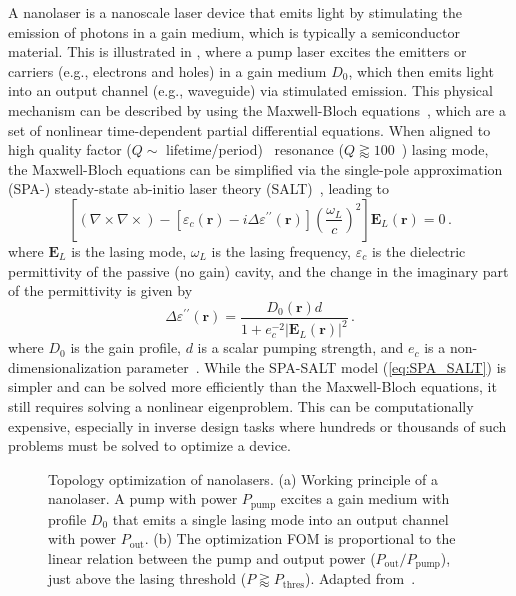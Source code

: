 A nanolaser is a nanoscale laser device that emits light by stimulating the emission of photons in a gain medium, which is typically a semiconductor material. This is illustrated
in , where a pump laser excites the emitters or carriers (e.g., electrons and holes) in a gain medium $D_0$, which then emits light into an output channel (e.g., waveguide) via
stimulated emission. This physical
mechanism can be described by using the Maxwell-Bloch equations~\cite{haken_laser_dynamics, PhysRev.134.A1429, SALT_original}, which are a set of nonlinear time-dependent 
partial differential equations. When aligned to high quality factor ($Q \sim$ lifetime/period)~\cite{phot_crys} resonance ($Q\gtrapprox 100$~\cite{cerjan_2016}) lasing
mode, the Maxwell-Bloch equations can be simplified via the single-pole approximation (SPA-) steady-state ab-initio laser theory (SALT)~\cite{Ge_2010}, leading to
\begin{equation}\label{eq:SPA_SALT}
    \left[(\nabla \times 
     \nabla \times ) -\left[\varepsilon_c(\mathbf{r})-i \Delta \varepsilon^{\prime \prime} (\mathbf{r})\right] \left(\frac{\omega_L}{c}\right)^2\right] \mathbf{E}_L(\mathbf{r})=0\,.
\end{equation}
where $\mathbf{E}_L$ is the lasing mode, $\omega_L$ is the lasing frequency, $\varepsilon_c$ is the dielectric permittivity of the passive (no gain) cavity, and the change in the 
imaginary part of the permittivity is given by
\begin{equation}\label{eq:gain_SALT}
        \Delta \varepsilon^{\prime \prime} (\mathbf{r}) =  \frac{D_0(\mathbf{r}) d}{1+ e_c^{-2}\left|\mathbf{E}_L(\mathbf{r})\right|^2}\,.
\end{equation}
where $D_0$ is the gain profile, $d$ is a scalar pumping strength, and $e_c$ is a non-dimensionalization parameter~\cite{Ge_2010}. While the SPA-SALT model (\eqref{eq:SPA_SALT}) 
is simpler and can be solved more efficiently than the Maxwell-Bloch equations, it still requires solving a nonlinear eigenproblem. This can be computationally expensive, especially in 
inverse design tasks where hundreds or thousands of such problems must be solved to optimize a device.

\begin{figure}[tb]
    \centering
    \caption{Topology optimization of nanolasers. (a) Working principle of a nanolaser. A pump with power $P_\text{pump}$ excites a gain medium with profile
    $D_0$ that emits a single lasing mode into an output channel with power $P_\text{out}$. (b) The optimization FOM is proportional to the linear relation between the pump and output power ($P_\text{out}/P_\text{pump}$),
    just above the lasing threshold ($P \gtrapprox P_\text{thres}$).  Adapted from~\cite{ownpub4}.}
    \label{fig:laser2d}
\end{figure}

